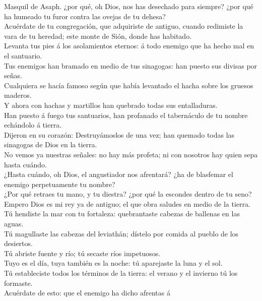  Masquil de Asaph. ¿por qué, oh Dios, nos has desechado
para siempre? ¿por qué ha humeado tu furor contra las ovejas de tu
dehesa?\\
 Acuérdate de tu congregación, que adquiriste de antiguo,
cuando redimiste la vara de tu heredad; este monte de Sión, donde has
habitado.\\
 Levanta tus pies á los asolamientos eternos: á todo
enemigo que ha hecho mal en el santuario.\\
 Tus enemigos han bramado en medio de tus sinagogas: han
puesto sus divisas por señas.\\
 Cualquiera se hacía famoso según que había levantado el
hacha sobre los gruesos maderos.\\
 Y ahora con hachas y martillos han quebrado todas sus
entalladuras.\\
 Han puesto á fuego tus santuarios, han profanado el
tabernáculo de tu nombre echándolo á tierra.\\
 Dijeron en su corazón: Destruyámoslos de una vez; han
quemado todas las sinagogas de Dios en la tierra.\\
 No vemos ya nuestras señales: no hay más profeta; ni con
nosotros hay quien sepa hasta cuándo.\\
 ¿Hasta cuándo, oh Dios, el angustiador nos afrentará?
¿ha de blasfemar el enemigo perpetuamente tu nombre?\\
 ¿Por qué retraes tu mano, y tu diestra? ¿por qué la
escondes dentro de tu seno?\\
 Empero Dios es mi rey ya de antiguo; el que obra saludes
en medio de la tierra.\\
 Tú hendiste la mar con tu fortaleza: quebrantaste
cabezas de ballenas en las aguas.\\
 Tú magullaste las cabezas del leviathán; dístelo por
comida al pueblo de los desiertos.\\
 Tú abriste fuente y río; tú secaste ríos impetuosos.\\
 Tuyo es el día, tuya también es la noche: tú aparejaste
la luna y el sol.\\
 Tú estableciste todos los términos de la tierra: el
verano y el invierno tú los formaste.\\
 Acuérdate de esto: que el enemigo ha dicho afrentas á
